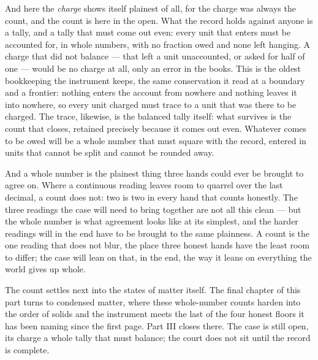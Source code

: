 And here the \emph{charge} shows itself plainest of all, for the charge was always the count, and the count is
here in the open. What the record holds against anyone is a tally, and a tally that must come out even: every
unit that enters must be accounted for, in whole numbers, with no fraction owed and none left hanging. A charge
that did not balance --- that left a unit unaccounted, or asked for half of one --- would be no charge at all,
only an error in the books. This is the oldest bookkeeping the instrument keeps, the same conservation it read
at a boundary and a frontier: nothing enters the account from nowhere and nothing leaves it into nowhere, so
every unit charged must trace to a unit that was there to be charged. The trace, likewise, is the balanced tally itself: what survives is the count that
closes, retained precisely because it comes out even. Whatever comes to be owed will be a whole number that must
square with the record, entered in units that cannot be split and cannot be rounded away.

And a whole number is the plainest thing three hands could ever be brought to agree on. Where a continuous
reading leaves room to quarrel over the last decimal, a count does not: two is two in every hand that counts
honestly. The three readings the case will need to bring together are not all this clean --- but the whole
number is what agreement looks like at its simplest, and the harder readings will in the end have to be brought
to the same plainness. A count is the one reading that does not blur, the place three honest hands have the
least room to differ; the case will lean on that, in the end, the way it leans on everything the world gives up
whole.

The count settles next into the states of matter itself. The final chapter of this part turns to condensed
matter, where these whole-number counts harden into the order of solids and the instrument meets the last of
the four honest floors it has been naming since the first page. Part III closes there. The case is still open,
its charge a whole tally that must balance; the court does not sit until the record is complete.

